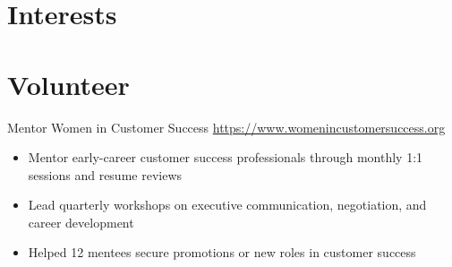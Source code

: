 \documentclass[a4paper, serif, 10pt]{moderncv}
\begin{document}
\section{Interests}

\section{Volunteer}

        {Mentor}
        {Women in Customer Success}
        {\url{https://www.womenincustomersuccess.org}}
        {}
        {\begin{itemize}
\item Mentor early-career customer success professionals through monthly 1:1 sessions and resume reviews
\item Lead quarterly workshops on executive communication, negotiation, and career development
\item Helped 12 mentees secure promotions or new roles in customer success
\end{itemize}}
    
\end{document}
